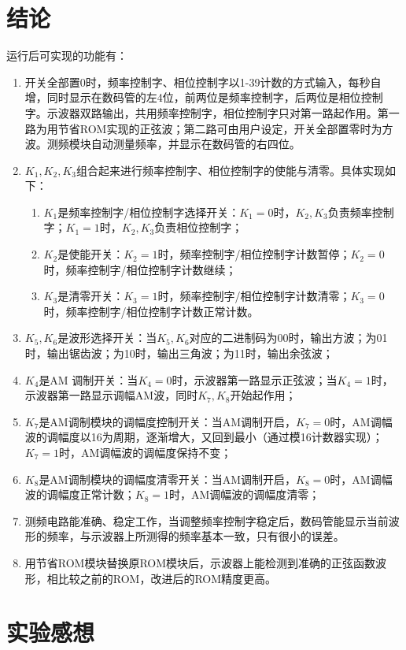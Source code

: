 \documentclass[12pt]{article}
\begin{document}
\section{ 结论}
运行后可实现的功能有：
\begin{enumerate}[1、]
\item 开关全部置0时，频率控制字、相位控制字以1-39计数的方式输入，每秒自增，同时显示在数码管的左4位，前两位是频率控制字，后两位是相位控制字。示波器双路输出，共用频率控制字，相位控制字只对第一路起作用。第一路为用节省ROM实现的正弦波；第二路可由用户设定，开关全部置零时为方波。测频模块自动测量频率，并显示在数码管的右四位。
\item $K_1,K_2,K_3$组合起来进行频率控制字、相位控制字的使能与清零。具体实现如下：
\begin{enumerate}[(1)]
\item $K_1$是频率控制字/相位控制字选择开关：$K_1=0$时，$K_2,K_3$负责频率控制字；$K_1=1$时，$K_2,K_3$负责相位控制字；
\item $K_2$是使能开关：$K_2=1$时，频率控制字/相位控制字计数暂停；$K_2=0$时，频率控制字/相位控制字计数继续；
\item $K_3$是清零开关：$K_3=1$时，频率控制字/相位控制字计数清零；$K_3=0$时，频率控制字/相位控制字计数正常计数。
\end{enumerate}
\item $K_5,K_6$是波形选择开关：当$K_5,K_6$对应的二进制码为00时，输出方波；为01时，输出锯齿波；为10时，输出三角波；为11时，输出余弦波；
\item $K_4$是AM 调制开关：当$K_4=0$时，示波器第一路显示正弦波；当$K_4=1$时，示波器第一路显示调幅AM波，同时$K_7,K_8$开始起作用；
\item $K_7$是AM调制模块的调幅度控制开关：当AM调制开启，$K_7=0$时，AM调幅波的调幅度以16为周期，逐渐增大，又回到最小（通过模16计数器实现）；$K_7=1$时，AM调幅波的调幅度保持不变；
\item $K_8$是AM调制模块的调幅度清零开关：当AM调制开启，$K_8=0$时，AM调幅波的调幅度正常计数；$K_8=1$时，AM调幅波的调幅度清零；
\item  测频电路能准确、稳定工作，当调整频率控制字稳定后，数码管能显示当前波形的频率，与示波器上所测得的频率基本一致，只有很小的误差。
\item 用节省ROM模块替换原ROM模块后，示波器上能检测到准确的正弦函数波形，相比较之前的ROM，改进后的ROM精度更高。
\end{enumerate}
\section{实验感想}
\end{document}
